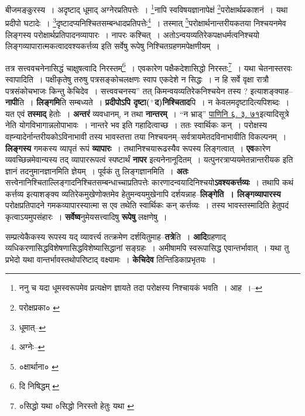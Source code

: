 \documentclass[article,12pt,a4paper]{memoir}
\newcommand{\add}[1]{($^{+}$#1)}
\begin{document}
	बीजमङ्कुरस्य । अदृष्टाद् धूमाद् अग्नेरप्रतिपत्तेः । \footnote{ननु च यदा धूमस्वरूपमेव प्रत्यक्षेण ज्ञायते तदा परोक्षस्य निश्चायकं भवति । आह ।--\cite{dp-msD-n}}\-नापि स्वविषयज्ञानापेक्षं \footnote{परोक्षप्रका० \cite{dp-msC}}\-परोक्षार्थप्रकाशनं । यथा प्रदीपो घटादेः । \footnote{धूमात्--\cite{dp-msD-n}}\-दृष्टादप्यनिश्चितसम्बन्धादप्रतिपत्तेः\footnote{अग्नेः--\cite{dp-msD-n}} । तस्मात् \footnote{०क्षार्थाना० \cite{dp-edE}}\-परोक्षार्थनान्तरीयकतया निश्चयनमेव लिङ्गस्य परोक्षार्थप्रतिपादनव्यापारः । नापरः कश्चित् । अतोऽन्वयव्यतिरेकपक्षधर्मत्वनिश्चयो लिङ्गव्यापारात्मकत्वादवश्यकर्त्तव्य इति सर्वेषु रूपेषु निश्चितग्रहणमपेक्षणीयम् । 
	  
	तत्र सत्त्ववचनेनासिद्धं चाक्षुषत्वादि निरस्तम्\footnote{दि निषिद्धम् \cite{dp-msB} \cite{dp-msD}} । एवकारेण पक्षैकदेशासिद्धो निरस्तः\footnote{०सिद्धो यथा \cite{dp-msA} \cite{dp-edN} \cite{dp-edP} ०सिद्धो निरस्तो हेतुः यथा \cite{dp-msB} \cite{dp-msD} \cite{dp-edE} \cite{dp-edH}} । यथा चेतनास्तरवः स्वापादिति । पक्षीकृतेषु तरुषु पत्रसङ्कोचलक्षणः स्वाप एकदेशे न सिद्धः । न हि सर्वे वृक्षा रात्रौ पत्रसंकोचभाजः किन्तु केचिदेव । सत्त्ववचनस्य” तत् किमन्वयव्यतिरेकनिश्चयेन तस्य ? इत्याशङ्क्याह--\textbf{नापी}ति । \textbf{लिङ्गमि}ति सम्बध्यते । \textbf{प्रदीपोऽपि दृष्टा\add{द}निश्चिताद}पि । न केवलमदृष्टादित्यपिशब्दः । यत एवं \textbf{तस्माद्} हेतोः । \textbf{अन्तरं} व्यवधानम्, न तथा \textbf{नान्तरम्} । “न भ्राड्” \href{http://http://sarit.indology.info/?cref=Pā.6.3.75}{पाणिनि ६. ३. ७१}इत्यादिसूत्रे नेति योगविभागान्नलोपाभावः । नान्तरे भव इति गहादित्वाच्छ । ततः स्वार्थिकः कन् । परोक्षस्य वह्न्यादेर्नान्तरीयकोऽविनाभावी तस्य भावस्तत्ता तया निश्चयनम्--सर्वत्रायमेतदविनाभावीति विकल्पनम् । \textbf{लिङ्गस्य} गमकस्य व्यापृतं रूपं \textbf{व्यापारः} । तथानिश्चयारूढस्यैव रूपस्य लिङ्गत्वात् । \textbf{एव}कारेण व्यवच्छिन्नमेवान्यस्य तद् व्यापाररूपत्वं स्पष्टार्थं \textbf{नापर} इत्यनेनानूदितम् । यत्पुनरत्राप्ययमेतन्नान्तरीयक इति ज्ञानं तदनुमानज्ञानमिति ज्ञेयम् । पूर्वकं तु लिङ्गज्ञानमिति । \textbf{अतः} सत्त्वेनानिश्चिताल्लिङ्गादनिश्चितसम्बन्धाच्चाप्रतिपत्तेः कारणादन्वयादिनिश्चयो\textbf{ऽवश्यकर्त्तव्यः} । तथापि कथं कर्त्तव्य इत्याशङ्क्य व्यतिरेकमुखेणोक्तमेव हेतुमन्वयमुखेनापि दर्शयन्नाह--\textbf{लिङ्गेति । लिङ्गव्यापारस्य} परोक्षप्रतिपादने गमकव्यापारस्यात्मा स एव तथेति स्वार्थिकः कन् कर्त्तव्यः । तस्य भावस्तस्मादिति हेतुपदं कृत्वाऽयमुपसंहारः । \textbf{सर्वेष्व}नुमेयसत्त्वादिषु \textbf{रूपेषु} लक्षणेषु । \leavevmode{}
	\pend
      

	  \pstart सम्प्रत्येकैकस्य रूपस्य यद् व्यावर्त्त्य तत्क्रमेण दर्शयितुमाह--\textbf{तत्रे}ति । \textbf{आदि}ग्रहणाद् व्यधिकरणासिद्धविशेषणासिद्धविशेष्यासिद्धानां सङ्ग्रहः । अमीषामपि स्वरूपासिद्ध एवान्तर्भावात् । यथा तु प्रभेदो यथा वान्तर्भावस्तथोपरिष्टाद् वक्ष्यामः । \textbf{केचिदेव} तिन्तिडिकाप्रभृतयः ।
	\pend
      
\end{document}
